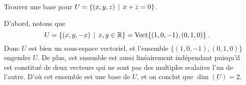 \begin{myprob} Trouvez une base pour $U = \{ (x,y,z) \, \mid \, x+z = 0\}$.

\begin{mysol} D'abord, notons que   
$$
U = \{ (x,y,-x) \, \mid \, x,y \in \mathbb{R}\} = \textrm{Vect}\{(1,0,-1), (0,1,0)\}\,.
$$
Donc $U$ est bien un sous-espace vectoriel, et l'ensemble $\{(1,0,-1), (0,1,0)\}$ engendre $U$. De plus, cet ensemble est aussi linéairement indépendant
puisqu'il est constitué de deux vecteurs qui ne sont pas des multiples  scalaires l'un de l'autre. D'o\`u cet ensemble est une base de $U$, et on conclut que $\dim(U)=2$.
\end{mysol}\end{myprob}

